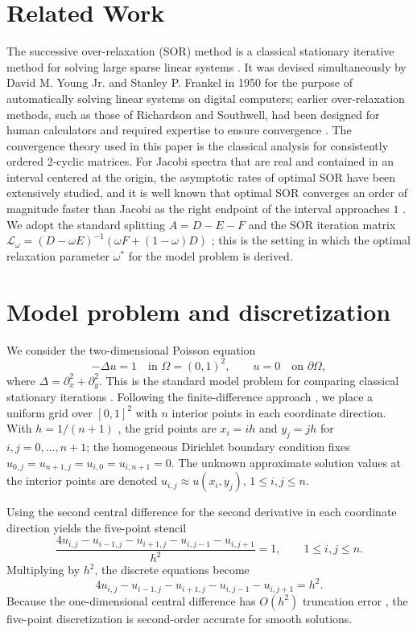 \documentclass[11pt]{article}
\begin{document}
\section{Related Work}
The successive over-relaxation (SOR) method is a classical stationary iterative method for solving large sparse linear systems \cite{hocking2025convergence}. It was devised simultaneously by David M. Young Jr. and Stanley P. Frankel in 1950 for the purpose of automatically solving linear systems on digital computers; earlier over-relaxation methods, such as those of Richardson and Southwell, had been designed for human calculators and required expertise to ensure convergence \cite{contributorssuccessive}. The convergence theory used in this paper is the classical analysis for consistently ordered 2-cyclic matrices. For Jacobi spectra that are real and contained in an interval centered at the origin, the asymptotic rates of optimal SOR have been extensively studied, and it is well known that optimal SOR converges an order of magnitude faster than Jacobi as the right endpoint of the interval approaches \(1\) \cite{hocking2025convergence}. We adopt the standard splitting \(A=D-E-F\) and the SOR iteration matrix \(\mathcal{L}_\omega=(D-\omega E)^{-1}(\omega F+(1-\omega)D)\) \cite{hocking2025convergence}; this is the setting in which the optimal relaxation parameter \(\omega^*\) for the model problem is derived.
\section{Model problem and discretization}
We consider the two-dimensional Poisson equation
\[
-\Delta u = 1 \quad \text{in } \Omega=(0,1)^2, \qquad u=0 \quad \text{on } \partial\Omega,
\]
where \(\Delta=\partial_x^2+\partial_y^2\). This is the standard model problem for comparing classical stationary iterations \cite{bindel2012matrix}. Following the finite-difference approach \cite{chen2025finite}, we place a uniform grid over \([0,1]^2\) with \(n\) interior points in each coordinate direction. With \(h=1/(n+1)\) \cite{bindel2012matrix}, the grid points are \(x_i=i h\) and \(y_j=j h\) for \(i,j=0,\dots,n+1\); the homogeneous Dirichlet boundary condition fixes \(u_{0,j}=u_{n+1,j}=u_{i,0}=u_{i,n+1}=0\). The unknown approximate solution values at the interior points are denoted \(u_{i,j}\approx u(x_i,y_j)\), \(1\le i,j\le n\).

Using the second central difference for the second derivative in each coordinate direction \cite{chen2025finite} yields the five-point stencil
\[
\frac{4u_{i,j}-u_{i-1,j}-u_{i+1,j}-u_{i,j-1}-u_{i,j+1}}{h^2}=1,
\qquad 1\le i,j\le n.
\]
Multiplying by \(h^2\), the discrete equations become
\[
4u_{i,j}-u_{i-1,j}-u_{i+1,j}-u_{i,j-1}-u_{i,j+1}=h^2.
\]
Because the one-dimensional central difference has \(O(h^2)\) truncation error \cite{chen2025finite}, the five-point discretization is second-order accurate for smooth solutions.
\end{document}
